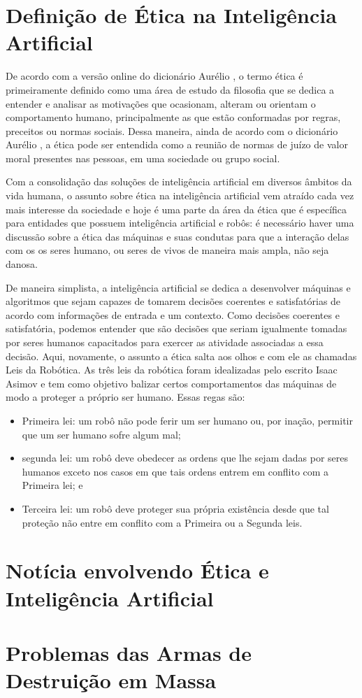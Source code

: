\documentclass{article}
\begin{document}
\section*{Definição de Ética na Inteligência Artificial}
De acordo com a versão online do dicionário Aurélio \cite{aurelio_online}, o termo ética é primeiramente definido como uma área de estudo da filosofia que se dedica a entender e analisar as motivações que ocasionam, alteram ou orientam o comportamento humano, principalmente as que estão conformadas por regras, preceitos ou normas sociais. Dessa maneira, ainda de acordo com o dicionário Aurélio \cite{aurelio_online}, a ética pode ser entendida como a reunião de normas de juízo de valor moral presentes nas pessoas, em uma sociedade ou grupo social. 

Com a consolidação das soluções de inteligência artificial em diversos âmbitos da vida humana, o assunto sobre ética na inteligência artificial vem atraído cada vez mais interesse da sociedade e hoje é uma parte da área da ética que é específica para entidades que possuem inteligência artificial e robôs: é necessário haver uma discussão sobre a ética das máquinas e suas condutas para que a interação delas com os os seres humano, ou seres de vivos de maneira mais ampla, não seja danosa.

De maneira simplista, a inteligência artificial se dedica a desenvolver máquinas e algoritmos que sejam capazes de tomarem decisões coerentes e satisfatórias de acordo com informações de entrada e um contexto. Como decisões coerentes e satisfatória, podemos entender que são decisões que seriam igualmente tomadas por seres humanos capacitados para exercer as atividade associadas a essa decisão. Aqui, novamente, o assunto a ética salta aos olhos e com ele as chamadas Leis da Robótica. As três leis da robótica foram idealizadas pelo escrito Isaac Asimov e tem como objetivo balizar certos comportamentos das máquinas de modo a proteger a próprio ser humano. Essas regas são:
\begin{itemize}
	\item Primeira lei: um robô não pode ferir um ser humano ou, por inação, permitir que um ser humano sofre algum mal;
	\item segunda lei: um robô deve obedecer as ordens que lhe sejam dadas por seres humanos exceto nos casos em que tais ordens entrem em conflito com a Primeira lei; e
	\item Terceira lei: um robô deve proteger sua própria existência desde que tal proteção não entre em conflito com a Primeira ou a Segunda leis.
\end{itemize}

\section*{Notícia envolvendo Ética e Inteligência Artificial}


\section*{Problemas das Armas de Destruição em Massa}


\end{document}
